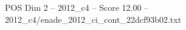 \begin{textsample}{POS Dim 2 – 2012\_c4 – Score 12.00 – 2012\_c4/enade\_2012\_ci\_cont\_22dcf93b02.txt}
\end{textsample}
